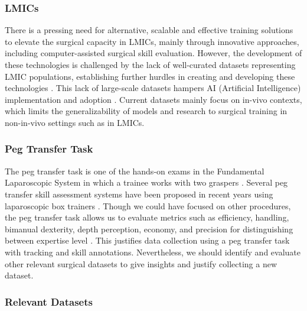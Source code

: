 \subsubsection{LMICs}

There is a pressing need for alternative, scalable and effective training solutions to elevate the surgical capacity in LMICs, mainly through innovative approaches, including computer-assisted surgical skill evaluation. However, the development of these technologies is challenged by the lack of well-curated datasets representing LMIC populations, establishing further hurdles in creating and developing these technologies \cite{maier-hein_surgical_2022, organization_health_2016}. This lack of large-scale datasets hampers AI (Artificial Intelligence) implementation and adoption \cite{nwoye_cholectrack20_2023, ali2023comprehensivesurveyrecentdeep}. Current datasets mainly focus on in-vivo contexts, which limits the generalizability of models and research to surgical training in non-in-vivo settings such as in LMICs. 

\subsubsection{Peg Transfer Task}

The peg transfer task is one of the hands-on exams in the Fundamental Laparoscopic System in which a trainee works with two graspers \cite{maciel_development_2008, matsumoto_laparoscopic_2022, Rashidi_Fathabadi_Grantner_Shebrain_Abdel}. Several peg transfer skill assessment systems have been proposed in recent years using laparoscopic box trainers \cite{Rashidi_Fathabadi_Grantner_Shebrain_Abdel, fathabadi_surgical_2021, fathabadi_surgical_2021-1, fathabadi_fuzzy_2022}. Though we could have focused on other procedures, the peg transfer task allows us to evaluate metrics such as efficiency, handling, bimanual dexterity, depth perception, economy, and precision for distinguishing between expertise level \cite{castillo-segura_objective_2021}. This justifies data collection using a peg transfer task with tracking and skill annotations. Nevertheless, we should identify and evaluate other relevant surgical datasets to give insights and justify collecting a new dataset.

\subsubsection{Relevant Datasets}

